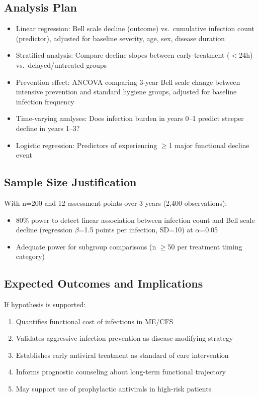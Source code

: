 \subsection{Analysis Plan}

\begin{itemize}
    \item Linear regression: Bell scale decline (outcome) vs.\ cumulative infection count (predictor), adjusted for baseline severity, age, sex, disease duration
    \item Stratified analysis: Compare decline slopes between early-treatment ($<$24h) vs.\ delayed/untreated groups
    \item Prevention effect: ANCOVA comparing 3-year Bell scale change between intensive prevention and standard hygiene groups, adjusted for baseline infection frequency
    \item Time-varying analyses: Does infection burden in years 0--1 predict steeper decline in years 1--3?
    \item Logistic regression: Predictors of experiencing $\geq$1 major functional decline event
\end{itemize}

\subsection{Sample Size Justification}

With n=200 and 12 assessment points over 3 years (2,400 observations):
\begin{itemize}
    \item 80\% power to detect linear association between infection count and Bell scale decline (regression $\beta$=1.5 points per infection, SD=10) at $\alpha$=0.05
    \item Adequate power for subgroup comparisons (n $\geq$50 per treatment timing category)
\end{itemize}

\subsection{Expected Outcomes and Implications}

If hypothesis is supported:
\begin{enumerate}
    \item Quantifies functional cost of infections in ME/CFS
    \item Validates aggressive infection prevention as disease-modifying strategy
    \item Establishes early antiviral treatment as standard of care intervention
    \item Informs prognostic counseling about long-term functional trajectory
    \item May support use of prophylactic antivirals in high-risk patients
\end{enumerate}

